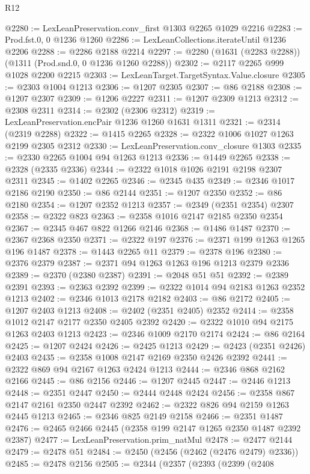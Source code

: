 \begin{lexlean}{R12}
\begin{coremodule}
@2280 := LexLeanPreservation.conv_first @1303 @2265 @1029 @2216
@2283 := Prod.fst.{0, 0} @1236 @1260
@2286 := LexLeanCollections.iterateUntil @1236 @2206
@2288 := @2286 @2188 @2214
@2297 := @2280 (@1631 (@2283 @2288)) (@1311 (Prod.snd.{0, 0} @1236 @1260 @2288))
@2302 := @2117 @2265 @999 @1028 @2200 @2215
@2303 := LexLeanTarget.TargetSyntax.Value.closure
@2305 := @2303 @1004 @1213
@2306 := @1207 @2305
@2307 := @86 @2188
@2308 := @1207 @2307
@2309 := @1206 @2227
@2311 := @1207 @2309 @1213
@2312 := @2308 @2311
@2314 := @2302 (@2306 @2312)
@2319 := LexLeanPreservation.encPair @1236 @1260 @1631 @1311
@2321 := @2314 (@2319 @2288)
@2322 := @1415 @2265
@2328 := @2322 @1006 @1027 @1263 @2199 @2305 @2312
@2330 := LexLeanPreservation.conv_closure @1303
@2335 := @2330 @2265 @1004 @94 @1263 @1213
@2336 := @1449 @2265
@2338 := @2328 (@2335 @2336)
@2344 := @2322 @1018 @1026 @2191 @2198 @2307 @2311
@2345 := @1402 @2265
@2346 := @2345 @435
@2349 := @2346 @1017 @2186 @2190
@2350 := @86 @2144
@2351 := @1207 @2350
@2352 := @86 @2180
@2354 := @1207 @2352 @1213
@2357 := @2349 (@2351 @2354) @2307
@2358 := @2322 @823
@2363 := @2358 @1016 @2147 @2185 @2350 @2354
@2367 := @2345 @467 @822 @1266 @2146
@2368 := @1486 @1487
@2370 := @2367 @2368 @2350
@2371 := @2322 @197
@2376 := @2371 @199 @1263 @1265 @196 @1487
@2378 := @1443 @2265 @11
@2379 := @2378 @196
@2380 := @2376 @2379
@2387 := @2371 @94 @1263 @1263 @196 @1213 @2379 @2336
@2389 := @2370 (@2380 @2387)
@2391 := @2048 @51 @51
@2392 := @2389 @2391
@2393 := @2363 @2392
@2399 := @2322 @1014 @94 @2183 @1263 @2352 @1213
@2402 := @2346 @1013 @2178 @2182
@2403 := @86 @2172
@2405 := @1207 @2403 @1213
@2408 := @2402 (@2351 @2405) @2352
@2414 := @2358 @1012 @2147 @2177 @2350 @2405 @2392
@2420 := @2322 @1010 @94 @2175 @1263 @2403 @1213
@2423 := @2346 @1009 @2170 @2174
@2424 := @86 @2164
@2425 := @1207 @2424
@2426 := @2425 @1213
@2429 := @2423 (@2351 @2426) @2403
@2435 := @2358 @1008 @2147 @2169 @2350 @2426 @2392
@2441 := @2322 @869 @94 @2167 @1263 @2424 @1213
@2444 := @2346 @868 @2162 @2166
@2445 := @86 @2156
@2446 := @1207 @2445
@2447 := @2446 @1213
@2448 := @2351 @2447
@2450 := @2444 @2448 @2424
@2456 := @2358 @867 @2147 @2161 @2350 @2447 @2392
@2462 := @2322 @826 @94 @2159 @1263 @2445 @1213
@2465 := @2346 @825 @2149 @2158
@2466 := @2351 @1487
@2476 := @2465 @2466 @2445 (@2358 @199 @2147 @1265 @2350 @1487 @2392 @2387)
@2477 := LexLeanPreservation.prim_natMul
@2478 := @2477 @2144
@2479 := @2478 @51
@2484 := @2450 (@2456 (@2462 (@2476 @2479) @2336))
@2485 := @2478 @2156
@2505 := @2344
    (@2357
      (@2393
        (@2399
          (@2408

\end{coremodule}
\end{lexlean}
